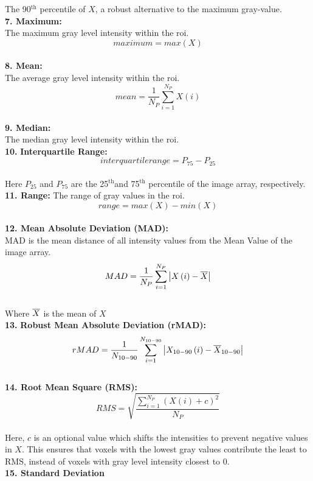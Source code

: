 The 90$^{\mathrm{th}}$ percentile of $X$, a robust alternative to the maximum gray-value. \\
\textbf{7. Maximum:}\\
The maximum gray level intensity within the \ac{roi}.\\
\[\textit{maximum}=max \left(X\right)\]\\
\textbf{8. Mean:}\\
The average gray level intensity within the \ac{roi}.\newline
\[mean=\frac{1}{N_{P}}\sum _{i=1}^{N_{P}}X\left(i\right)\]\\
\textbf{9. Median:}\\
The median gray level intensity within the \ac{roi}.\\
\textbf{10.} \textbf{Interquartile Range:}\\
\[\textit{interquartilerange}=P_{75}-P_{25}\]\\
Here $P_{25}$ and $P_{75}$ {are the 25}$^{\mathrm{th}}${and 75}$^{\mathrm{th}}$ {percentile of the image array, respectively.}\\
\textbf{11. Range:}\newline
The range of gray values in the \ac{roi}.\\
\[\textit{range}=max\left(X\right)-min \left(X\right)\]\\
\textbf{12. Mean Absolute Deviation (MAD):}\\
MAD is the mean distance of all intensity values from the Mean Value of the image array.\\
\[MAD=\frac{1}{N_{P}}\sum _{i=1}^{N_{P}}\left| X\left(i\right)-\overline{X}\right|\] \\
{Where } $\overline{X}$ {is the mean of} $X$\\
\textbf{13.} \textbf{Robust Mean Absolute Deviation (rMAD):}\\
\[rMAD=\frac{1}{N_{10-90}}\sum _{i=1}^{N_{10-90}}\left| X_{10-90}\left(i\right)-\overline{X}_{10-90}\right|\] \\
\textbf{14. Root Mean Square (RMS):}\\
\[RMS=\sqrt{\frac{\sum _{i=1}^{N_{P}}\left(X\left(i\right)+c\right)^{2}}{N_{P}}}\]\\
Here, $c$ is an optional value which shifts the intensities to prevent negative values in $X$. This ensures that voxels with the lowest gray values contribute the least to RMS, instead of voxels with gray level intensity closest to 0.\\
\textbf{15. Standard Deviation}\\
